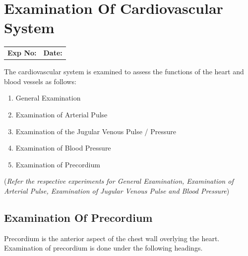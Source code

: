 \documentclass[a4paper,12pt,openany,oneside]{book}
\begin{document}
															\chapter*{\centering Examination Of Cardiovascular System}
															\begin{tabular}{p{5in} p{1in}}
																\textbf{Exp No:}  & \textbf{Date:}\\
															\end{tabular}
															\par
The cardiovascular system is examined to assess the functions of the heart and blood vessels as follows:
\begin{enumerate}
\item{General Examination}
\item{Examination of Arterial Pulse}
\item{Examination of the Jugular Venous Pulse / Pressure}
\item{Examination of Blood Pressure}
\item{Examination of Precordium}
\end{enumerate}

(\emph{Refer the respective experiments for General Examination, Examination of Arterial Pulse, Examination of Jugular Venous Pulse and Blood Pressure})

\section*{Examination Of Precordium}
\par
Precordium is the anterior aspect of the chest wall overlying the heart. Examination of precordium is done under the following headings.
\end{document}
